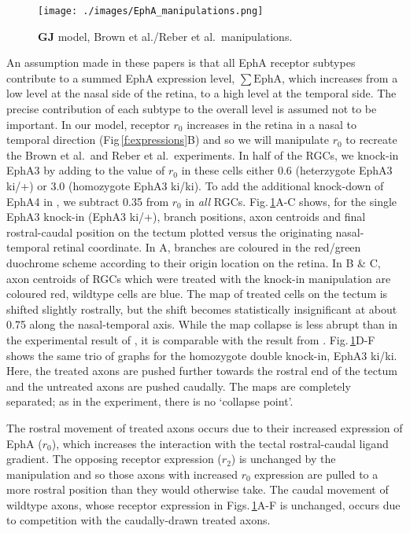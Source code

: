 \documentclass[11pt, a4paper]{article}
\begin{document}
\begin{figure}
\texttt{[image: ./images/EphA\_manipulations.png]}
\caption{$\mathbf{GJ}$ model, Brown et al./Reber et al.~manipulations.}
\label{f:GJeph}
\end{figure}

An assumption made in these papers is that all EphA receptor subtypes
contribute to a summed EphA expression level, $\sum\mathrm{EphA}$, which
increases from a low level at the nasal side of the retina, to a high level at
the temporal side. The precise contribution of each subtype to the overall
level is assumed not to be important. In our model, receptor $r_0$ increases
in the retina in a nasal to temporal direction (Fig\,\ref{f:expressions}B) and
so we will manipulate $r_0$ to recreate the Brown et al.~and Reber et
al.~experiments. In half of the RGCs, we knock-in EphA3 by adding to the value
of $r_0$ in these cells either 0.6 (heterzygote EphA3 ki/+) or 3.0 (homozygote
EphA3 ki/ki). To add the additional knock-down of EphA4
in \citet{reber_relative_2004}, we subtract 0.35 from $r_0$ in \emph{all}
RGCs. Fig.\,\ref{f:GJeph}A-C shows, for the single EphA3 knock-in (EphA3
ki/+), branch positions, axon centroids and final rostral-caudal position on
the tectum plotted versus the originating nasal-temporal retinal
coordinate. In A, branches are coloured in the red/green duochrome scheme
according to their origin location on the retina. In B \& C, axon centroids of
RGCs which were treated with the knock-in manipulation are coloured red,
wildtype cells are blue. The map of treated cells on the tectum is shifted
slightly rostrally, but the shift becomes statistically insignificant at about
0.75 along the nasal-temporal axis. While the map collapse is less abrupt than
in the experimental result of \citet{brown_topographic_2000}, it is comparable
with the result from \citet{simpson_simple_2011}.  Fig.\,\ref{f:GJeph}D-F
shows the same trio of graphs for the homozygote double knock-in, EphA3
ki/ki. Here, the treated axons are pushed further towards the rostral end of
the tectum and the untreated axons are pushed caudally. The maps are
completely separated; as in the experiment, there is no `collapse point'.

The rostral movement of treated axons occurs due to their increased expression
of EphA ($r_0$), which increases the interaction with the tectal
rostral-caudal ligand gradient. The opposing receptor expression ($r_2$) is
unchanged by the manipulation and so those axons with increased $r_0$
expression are pulled to a more rostral position than they would otherwise
take. The caudal movement of wildtype axons, whose receptor expression in
Figs.\,\ref{f:GJeph}A-F is unchanged, occurs due to competition with the
caudally-drawn treated axons.
%
\end{document}
